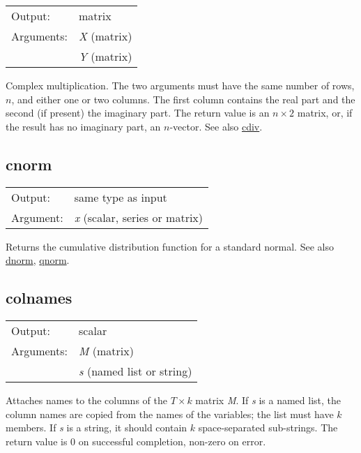 \begin{tabular}{ll}
Output:     & matrix\\
Arguments:  & \textsl{X} (matrix)\\
           & \textsl{Y} (matrix)\\
\end{tabular}

	  Complex multiplication. The two arguments must have the same
	  number of rows, \ensuremath{n}, and either one or two columns.
	  The first column contains the real part and the second (if
	  present) the imaginary part.  The return value is an
	  \ensuremath{n\times 2} matrix, or, if the result has no imaginary
	  part, an \ensuremath{n}-vector. 
	  See also \hyperlink{func-cdiv}{cdiv}.

\subsection{cnorm}
\hypertarget{func-cnorm}{}

\begin{tabular}{ll}
Output:     & same type as input\\
Argument:   & \textsl{x} (scalar, series or matrix)\\
\end{tabular}

	  Returns the cumulative distribution function for a standard
	  normal. 
	  See also \hyperlink{func-dnorm}{dnorm}, \hyperlink{func-qnorm}{qnorm}.

\subsection{colnames}
\hypertarget{func-colnames}{}

\begin{tabular}{ll}
Output:     & scalar\\
Arguments:  & \textsl{M} (matrix)\\
           & \textsl{s} (named list or string)\\
\end{tabular}

	  Attaches names to the columns of the \ensuremath{T\times k} matrix
	  \textsl{M}. If \textsl{s} is a named list, the
	  column names are copied from the names of the variables; the list
	  must have \ensuremath{k} members. If \textsl{s} is a
	  string, it should contain \ensuremath{k} space-separated
	  sub-strings.  The return value is 0 on successful completion,
	  non-zero on error.

